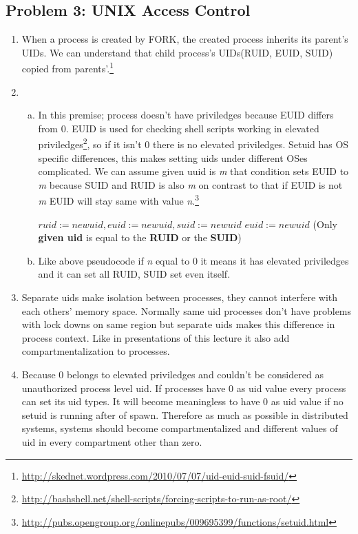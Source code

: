 \documentclass[11pt]{article}
\begin{document}
\subsection*{Problem 3: UNIX Access Control}
\begin{enumerate}[\indent a)]
\item When a process is created by FORK, the created process inherits its parent's UIDs. We can understand that child process's  UIDs(RUID, EUID, SUID) copied from parents'.\footnote{\url{http://skednet.wordpress.com/2010/07/07/uid-euid-suid-fsuid/}}

\item
\begin{enumerate}[a)]
\item In this premise; process doesn't have priviledges because EUID differs from 0. EUID is used for checking shell scripts working in elevated priviledges\footnote{\url{http://bashshell.net/shell-scripts/forcing-scripts-to-run-as-root/}}, so if it isn't 0 there is no elevated priviledges. Setuid has OS specific differences, this makes setting uids under different OSes complicated\cite{chen2002setuid}. We can assume given uuid is \textit{m} that condition sets EUID to \textit{m} because SUID and RUID is also \textit{m} on contrast to that if EUID is not \textit{m} EUID will stay same with value \textit{n}.\footnote{\url{http://pubs.opengroup.org/onlinepubs/009695399/functions/setuid.html}}
\begin{algorithmic}
    \State $ruid := newuid, euid := newuid, suid := newuid$
\Else
    \State $euid := newuid$ (Only \textbf{given uid} is equal to the \textbf{RUID} or the \textbf{SUID})
\EndIf
\end{algorithmic}
\item Like above pseudocode if \textit{n} equal to 0 it means it has elevated priviledges and it can set all RUID, SUID set even itself.
\end{enumerate}

\item Separate uids make isolation between processes, they cannot interfere with each others' memory space. Normally same uid processes don't have problems with lock downs on same region but separate uids makes this difference in process context. Like in presentations of this lecture it also add compartmentalization to processes.

\item Because 0 belongs to elevated priviledges and couldn't be considered as unauthorized process level uid. If processes have 0 as uid value every process can set its uid types. It will become meaningless to have 0 as uid value if no setuid is running after of spawn. Therefore as much as possible in distributed systems, systems should become compartmentalized and different values of uid in every compartment other than zero.


\end{enumerate}
\end{document}
